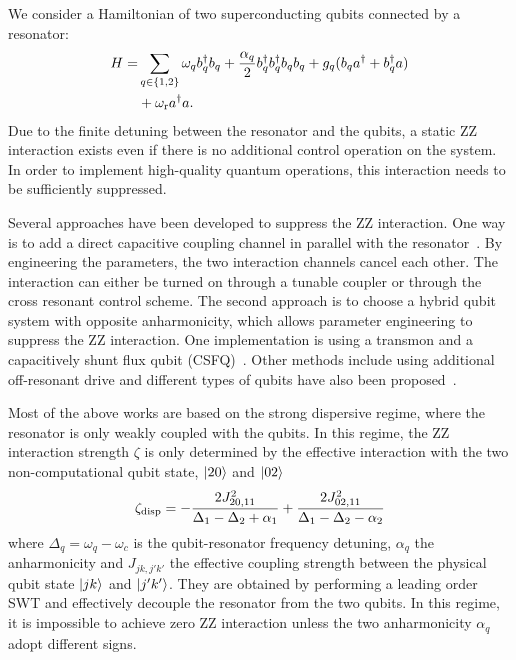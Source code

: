 \documentclass[%
 reprint,
 amsmath,amssymb,
 aps,
pra,
noeprint,
superscriptaddress,
]{revtex4-2}
\begin{document}
We consider a Hamiltonian of two superconducting qubits connected by a resonator:
\begin{align}
    \label{eq:qubit-resonator-qubit ham}
    H = & \sum_{q \in \{1,2\}} \omega_q b_q^{\dagger} b_q+ 
    \frac{\alpha_q}{2} b_q^{\dagger} b_q^{\dagger} b_qb_q
    + g_q (b_q a^{\dagger} + b_q^{\dagger} a)\\ \nonumber
    &+ \omega_{\rm{r}} a^{\dagger} a
    .
\end{align}
Due to the finite detuning between the resonator and the qubits, a static ZZ interaction exists even if there is no additional control operation on the system.
In order to implement high-quality quantum operations, this interaction needs to be sufficiently suppressed.

Several approaches have been developed to suppress the ZZ interaction.
One way is to add a direct capacitive coupling channel in parallel with the resonator~\cite{Mundada2019,Xu2020,kandala2021,Sung2020,Zhao2020a,Chu2021,Li2020,Sete2021,Stehlik2021,Collodo2020,Xu2020zz}.
By engineering the parameters, the two interaction channels cancel each other.
The interaction can either be turned on through a tunable coupler or through the cross resonant control scheme.
The second approach is to choose a hybrid qubit system with opposite anharmonicity, which allows parameter engineering to suppress the ZZ interaction.
One implementation is using a transmon and a capacitively shunt flux qubit (CSFQ)~\cite{Zhao2020,Ku2020}.
Other methods include using additional off-resonant drive \cite{Wei2021,Mitchell2021,Xiong2021} and different types of qubits have also been proposed~\cite{Finck2021}.

Most of the above works are based on the strong dispersive regime, where the resonator is only weakly coupled with the qubits.
In this regime, the ZZ interaction strength $\zeta$ is only determined by the effective interaction with the two non-computational qubit state, $\ket{20}$ and $\ket{02}$~\cite{Magesan2020}
\begin{equation}
    \label{eq:strong dispersive zeta}
    \zeta_{\textnormal{disp}} = -\frac{2J^2_{20,11}}{\Delta_1-\Delta_2+\alpha_1} + \frac{2J^2_{02,11}}{\Delta_1-\Delta_2-\alpha_2}
\end{equation}
where $\Delta_q=\omega_{q} - \omega_{c}$ is the qubit-resonator frequency detuning, $\alpha_q$ the anharmonicity and $J_{jk,j'k'}$ the effective coupling strength between the physical qubit state $\ket{jk}$ and $\ket{j'k'}$.
They are obtained by performing a leading order SWT and effectively decouple the resonator from the two qubits.
In this regime, it is impossible to achieve zero ZZ interaction unless the two anharmonicity $\alpha_q$ adopt different signs.
\end{document}
